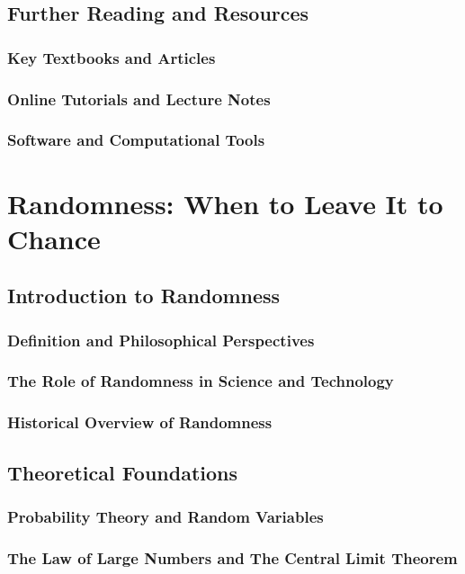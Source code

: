 \documentclass[12pt]{book} %
\begin{document}
\section{Further Reading and Resources}
\subsection{Key Textbooks and Articles}
\subsection{Online Tutorials and Lecture Notes}
\subsection{Software and Computational Tools}

\chapter{Randomness: When to Leave It to Chance}

\section{Introduction to Randomness}
\subsection{Definition and Philosophical Perspectives}
\subsection{The Role of Randomness in Science and Technology}
\subsection{Historical Overview of Randomness}

\section{Theoretical Foundations}
\subsection{Probability Theory and Random Variables}
\subsection{The Law of Large Numbers and The Central Limit Theorem}
\end{document}
